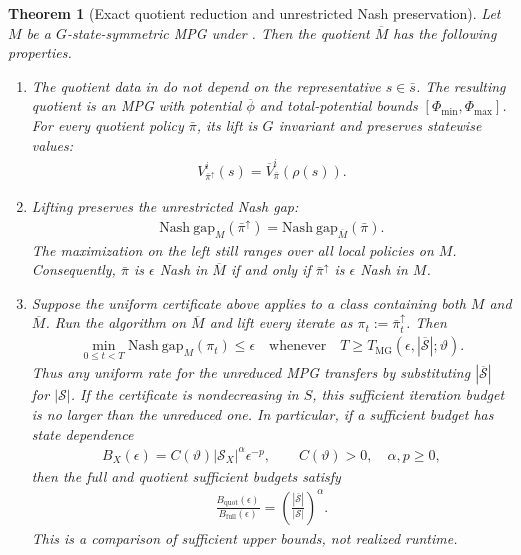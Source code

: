 \documentclass{article}
\theoremstyle{plain}
\newtheorem{theorem}{Theorem}
\theoremstyle{definition}
\theoremstyle{remark}
\newcommand{\Nash}{\mathrm{Nash\ gap}}
\newcommand{\St}{\mathcal{S}}
\newcommand{\abs}[1]{\left\lvert#1\right\rvert}
\newcommand{\quotient}[1]{\overline{#1}}
\newcommand{\Vbar}{\overline{V}}
\begin{document}
\begin{theorem}[Exact quotient reduction and unrestricted Nash preservation]
\label{thm:exact-quotient}
Let $M$ be a $G$-state-symmetric MPG under
. Then the quotient
$\quotient M$ has the following properties.
\begin{enumerate}[label=\arabic*.,leftmargin=2.0em,itemsep=2pt,topsep=2pt]
  \item The quotient data in  do not depend on the
  representative $s\in\bar s$. The resulting quotient is an MPG with
  potential $\quotient\phi$ and total-potential bounds
  $[\Phi_{\min},\Phi_{\max}]$.  For every quotient policy $\bar\pi$, its lift is
  $G$ invariant and preserves statewise values:
  \begin{align*}
    V^i_{\bar\pi^\uparrow}(s)
    =
    \Vbar^i_{\bar\pi}(\rho(s)).
  \end{align*}
  \item Lifting preserves the unrestricted Nash gap:
  \begin{align}
    \Nash_M(\bar\pi^\uparrow)
    =
    \Nash_{\quotient M}(\bar\pi).
    \label{eq:nash-gap-preservation}
  \end{align}
  The maximization on the left still ranges over all local policies on $M$.
  Consequently, $\bar\pi$ is $\epsilon$ Nash in $\quotient M$ if and only if
  $\bar\pi^\uparrow$ is $\epsilon$ Nash in $M$.

  \item \label{item:quotient-rate-transfer}
  Suppose the uniform certificate above applies to a class containing both
  $M$ and $\quotient M$. Run the algorithm on $\quotient M$ and lift every
  iterate as
  $\pi_t:=\bar\pi_t^\uparrow$. Then
  \begin{align}
    \min_{0\le t<T}\Nash_M(\pi_t)
    \le\epsilon
    \quad\text{whenever}\quad
    T\ge
    T_{\mathrm{MG}}
    (\epsilon,\abs{\quotient\St};\vartheta).
    \label{eq:quotient-black-box-rate}
  \end{align}
  Thus any uniform rate for the unreduced MPG transfers by substituting
  $\abs{\quotient\St}$ for $\abs\St$. If the certificate is nondecreasing in $S$,
  this sufficient iteration budget is no larger than the unreduced one.
  In particular, if a sufficient budget has state dependence
  \begin{align*}
    B_X(\epsilon)
    =
    C(\vartheta)\abs{\mathcal S_X}^{\alpha}\epsilon^{-p},
    \qquad
    C(\vartheta)>0,\quad \alpha,p\ge0,
  \end{align*}
  then the full and quotient sufficient budgets satisfy
  \begin{align}
    \frac{B_{\mathrm{quot}}(\epsilon)}
         {B_{\mathrm{full}}(\epsilon)}
    =
    \left(
      \frac{\abs{\quotient\St}}{\abs\St}
    \right)^\alpha.
    \label{eq:quotient-state-rate-factor}
  \end{align}
  This is a comparison of sufficient upper bounds, not realized runtime.
\end{enumerate}
\end{theorem}
\end{document}
